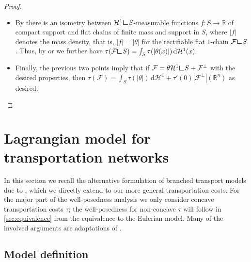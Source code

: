 \documentclass[10pt,a4paper,oneside,final]{article}
\newcommand{\R}{{\mathbb{R}}}
\newcommand{\de}{{\mathrm{d}}}
\newcommand{\hdone}{\mathcal{H}^1}
\newcommand{\restr}{{\mbox{\LARGE$\llcorner$}}}
\newcommand{\flux}{{\mathcal{F}}}
\numberwithin{equation}{section}
\theoremstyle{plain}
\theoremstyle{definition}
\theoremstyle{remark}
\newcommand{\notinclude}[1]{}
\begin{document}
\begin{proof}
\begin{itemize}
\item By \cite[Sec.\,6]{Wh99b} there is an isometry between $\hdone\restr S$-measurable functions $f:S\to\R$ of compact support and flat chains of finite mass and support in $S$,
where $|f|$ denotes the mass density, that is, $|f|=|\theta|$ for the rectifiable flat $1$-chain $\flux\restr S$.
Thus, by \cite[Sec.\,6]{Wh99b} or \cite{CoRoMa17} we further have $\tau(\flux\restr S)=\int_S\tau(|\theta(x)|)\,\de\hdone(x)$.
\item Finally, the previous two points imply that if $\flux=\theta\hdone\restr S+\flux^\perp$ with the desired properties, then $\tau(\flux)=\int_S\tau(|\theta|)\,\de\hdone+\tau'(0)|\flux^\perp|(\R^n)$ as desired.
\qedhere
\end{itemize}
\end{proof}

\notinclude{https://en.wikipedia.org/wiki/Exterior_algebra
http://math.stackexchange.com/questions/240491/what-is-a-covector-and-what-is-it-used-for
https://en.wikipedia.org/wiki/Differential_form
https://en.wikipedia.org/wiki/Exterior_derivative
https://web.math.princeton.edu/~ochodosh/GMTnotes.pdf
helps}


\section{Lagrangian model for transportation networks}\label{sec:MMS}

In this section we recall the alternative formulation of branched transport models due to \cite{Maddalena-Morel-Solimini-Irrigation-Patterns}, which we directly extend to our more general transportation costs.
For the major part of the well-posedness analysis we only consider concave transportation costs $\tau$;
the well-posedness for non-concave $\tau$ will follow in \cref{sec:equivalence} from the equivalence to the Eulerian model.
Many of the involved arguments are adaptations of \cite{Maddalena-Morel-Solimini-Irrigation-Patterns,Bernot-Caselles-Morel-Traffic-Plans,Bernot-Caselles-Morel-Structure-Branched,Maddalena-Solimini-Transport-Distances,BrWi15-equivalent}.

\subsection{Model definition}
\end{document}
